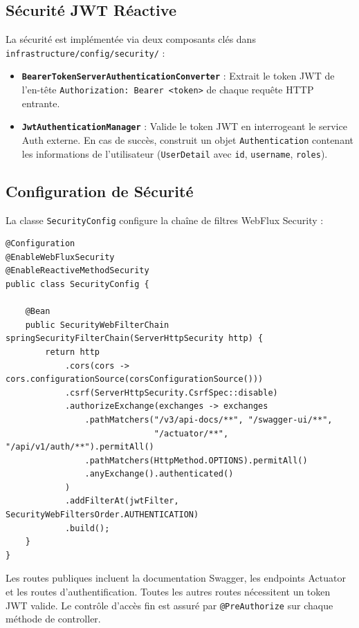 \documentclass[12pt,a4paper]{report}
\begin{document}
\subsection{Sécurité JWT Réactive}

La sécurité est implémentée via deux composants clés dans \texttt{infrastructure/config/security/} :

\begin{itemize}[leftmargin=2cm]
  \item \textbf{\texttt{BearerTokenServerAuthenticationConverter}} : Extrait le token JWT de l'en-tête \texttt{Authorization: Bearer <token>} de chaque requête HTTP entrante.
  \item \textbf{\texttt{JwtAuthenticationManager}} : Valide le token JWT en interrogeant le service Auth externe. En cas de succès, construit un objet \texttt{Authentication} contenant les informations de l'utilisateur (\texttt{UserDetail} avec \texttt{id}, \texttt{username}, \texttt{roles}).
\end{itemize}

\subsection{Configuration de Sécurité}

La classe \texttt{SecurityConfig} configure la chaîne de filtres WebFlux Security :

\begin{lstlisting}[style=javaStyle, caption={Configuration de sécurité WebFlux}]
@Configuration
@EnableWebFluxSecurity
@EnableReactiveMethodSecurity
public class SecurityConfig {

    @Bean
    public SecurityWebFilterChain springSecurityFilterChain(ServerHttpSecurity http) {
        return http
            .cors(cors -> cors.configurationSource(corsConfigurationSource()))
            .csrf(ServerHttpSecurity.CsrfSpec::disable)
            .authorizeExchange(exchanges -> exchanges
                .pathMatchers("/v3/api-docs/**", "/swagger-ui/**",
                              "/actuator/**", "/api/v1/auth/**").permitAll()
                .pathMatchers(HttpMethod.OPTIONS).permitAll()
                .anyExchange().authenticated()
            )
            .addFilterAt(jwtFilter, SecurityWebFiltersOrder.AUTHENTICATION)
            .build();
    }
}
\end{lstlisting}

Les routes publiques incluent la documentation Swagger, les endpoints Actuator et les routes d'authentification. Toutes les autres routes nécessitent un token JWT valide. Le contrôle d'accès fin est assuré par \texttt{@PreAuthorize} sur chaque méthode de controller.
\end{document}
